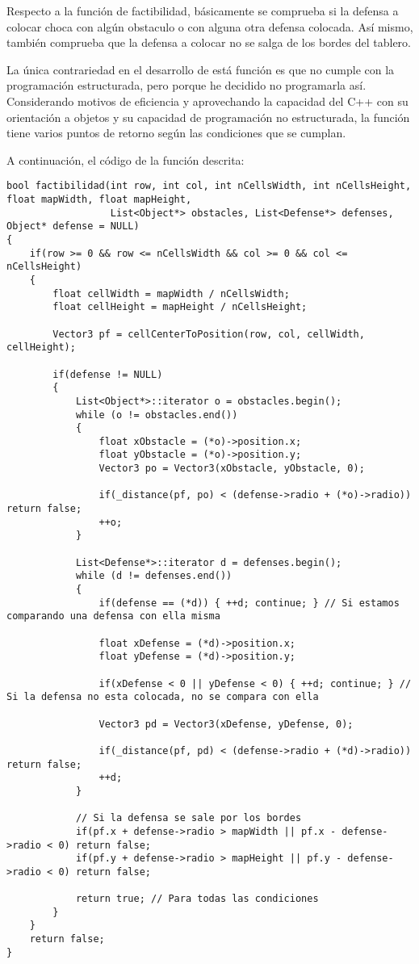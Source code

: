 Respecto a la función de factibilidad, básicamente se comprueba
si la defensa a colocar choca con algún obstaculo o con alguna
otra defensa colocada. Así mismo, también comprueba que la defensa
a colocar no se salga de los bordes del tablero.

La única contrariedad en el desarrollo de está función es que
no cumple con la programación estructurada, pero porque he decidido
no programarla así. Considerando motivos de eficiencia y aprovechando
la capacidad del C++ con su orientación a objetos y su capacidad
de programación no estructurada, la función tiene varios puntos de
retorno según las condiciones que se cumplan.

A continuación, el código de la función descrita:

\lstset{language=C++, texcl=true}
\begin{lstlisting}[frame=single]
bool factibilidad(int row, int col, int nCellsWidth, int nCellsHeight, float mapWidth, float mapHeight,
                  List<Object*> obstacles, List<Defense*> defenses, Object* defense = NULL)
{
    if(row >= 0 && row <= nCellsWidth && col >= 0 && col <= nCellsHeight)
    {
        float cellWidth = mapWidth / nCellsWidth;
        float cellHeight = mapHeight / nCellsHeight;

        Vector3 pf = cellCenterToPosition(row, col, cellWidth, cellHeight);

        if(defense != NULL)
        {
            List<Object*>::iterator o = obstacles.begin();
            while (o != obstacles.end())
            {
                float xObstacle = (*o)->position.x;
                float yObstacle = (*o)->position.y;
                Vector3 po = Vector3(xObstacle, yObstacle, 0);

                if(_distance(pf, po) < (defense->radio + (*o)->radio)) return false;
                ++o;
            }

            List<Defense*>::iterator d = defenses.begin();
            while (d != defenses.end())
            {
                if(defense == (*d)) { ++d; continue; } // Si estamos comparando una defensa con ella misma

                float xDefense = (*d)->position.x;
                float yDefense = (*d)->position.y;

                if(xDefense < 0 || yDefense < 0) { ++d; continue; } // Si la defensa no esta colocada, no se compara con ella

                Vector3 pd = Vector3(xDefense, yDefense, 0);

                if(_distance(pf, pd) < (defense->radio + (*d)->radio)) return false;
                ++d;
            }

            // Si la defensa se sale por los bordes
            if(pf.x + defense->radio > mapWidth || pf.x - defense->radio < 0) return false;
            if(pf.y + defense->radio > mapHeight || pf.y - defense->radio < 0) return false;

            return true; // Para todas las condiciones
        }
    }
    return false;
}
\end{lstlisting}
